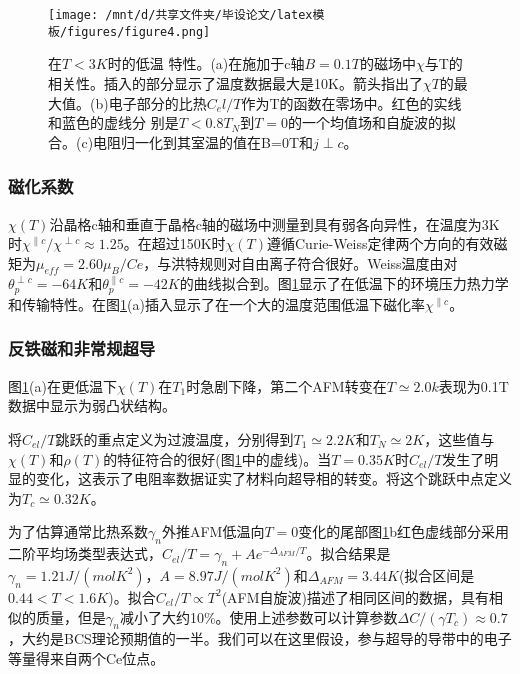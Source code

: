 \begin{figure}[h]
    \centering
    \texttt{[image: /mnt/d/共享文件夹/毕设论文/latex模板/figures/figure4.png]}
    \caption{在$T < 3K$时的低温 特性。(a)在施加于c轴$B = 0.1T$的磁场中$\chi$与T的相关性。插入的部分显示了温度数据最大是10K。箭头指出了$\chi T$的最大值。(b)电子部分的比热$C_el/T$作为T的函数在零场中。红色的实线和蓝色的虚线分 别是$T < 0.8T_N$到$T = 0$的一个均值场和自旋波的拟合。(c)电阻归一化到其室温的值在B=0T和$j\perp c$\cite{8}。}
    \label{fig2}
\end{figure}

\subsubsection{磁化系数}
$\chi(T)$沿晶格c轴和垂直于晶格c轴的磁场中测量到具有弱各向异性，在温度为3K时$\chi^{\parallel c}/\chi^{\perp c} \approx 1.25$。在超过150K时$\chi(T)$遵循Curie-Weiss定律两个方向的有效磁矩为$\mu_{eff}=2.60\mu_B /Ce$，与洪特规则对自由离子符合很好。Weiss温度由对$\theta^{\perp c}_{p}=-64K$和$\theta^{\parallel c}_p=-42K$的曲线拟合到。图\ref{fig2}显示了在低温下的环境压力热力学和传输特性。在图\ref{fig2}(a)插入显示了在一个大的温度范围低温下磁化率$\chi^{\parallel c}$。

\subsubsection{反铁磁和非常规超导}
图\ref{fig2}(a)在更低温下$\chi(T)$在$T_1$时急剧下降，第二个AFM转变在$T \simeq 2.0k$表现为0.1T数据中显示为弱凸状结构。

将$C_{el}/T$跳跃的重点定义为过渡温度，分别得到$T_1 \simeq 2.2K$和$T_N \simeq 2K$，这些值与$\chi(T)$和$\rho(T)$的特征符合的很好(图\ref{fig2}中的虚线)。当$T=0.35K$时$C_{el}/T$发生了明显的变化，这表示了电阻率数据证实了材料向超导相的转变。将这个跳跃中点定义为$T_c \simeq 0.32K$。

为了估算通常比热系数$\gamma_n$外推AFM低温向$T=0$变化的尾部图\ref{fig2}b红色虚线部分采用二阶平均场类型表达式，$C_{el}/T=\gamma_n + A e^{-\Delta_{AFM}/T}$。拟合结果是$\gamma_n=1.21J/(molK^2)$，$A=8.97J/(molK^2)$和$\Delta_{AFM}=3.44K$(拟合区间是$0.44<T<1.6K$)。拟合$C_{el}/T \propto T^2$(AFM自旋波)描述了相同区间的数据，具有相似的质量，但是$\gamma_n$减小了大约10\%。使用上述参数可以计算参数$\Delta C/(\gamma T_c)\approx 0.7$，大约是BCS理论预期值的一半。我们可以在这里假设，参与超导的导带中的电子等量得来自两个Ce位点。







